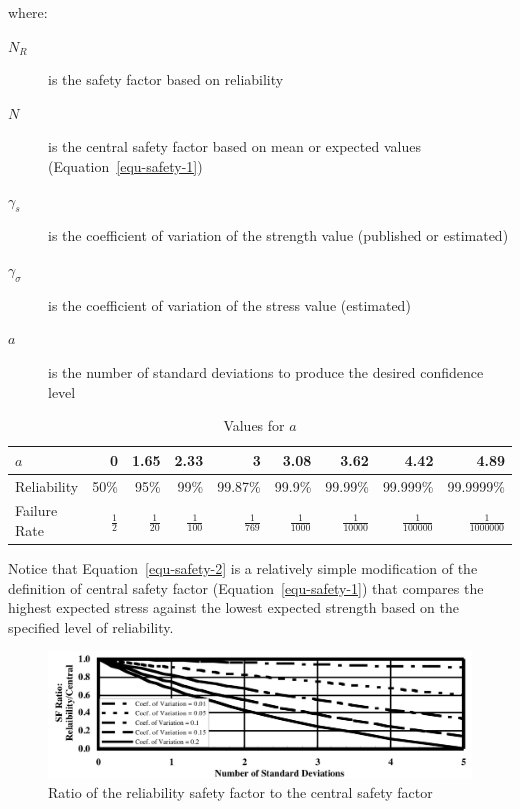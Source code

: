 \noindent where:

\begin{description}
  \item[$N_R$] is the safety factor based on reliability
  \item[$N$] is the central safety factor based on mean or expected values (Equation~\ref{equ-safety-1})
  \item[$\gamma_s$] is the coefficient of variation of the strength value (published or estimated)
  \item[$\gamma_\sigma$] is the coefficient of variation of the stress value (estimated)
  \item[$a$] is the number of standard deviations to produce the desired confidence level 
\end{description}

\begin{table}
  \center{}
  \small
  \begin{tabular}{l r r r r r r r r}
    \toprule
    $a$ & 0 & 1.65 & 2.33 & 3 & 3.08 & 3.62 & 4.42 & 4.89 \\
    \midrule
    Reliability & 50\% & 95\% & 99\% & 99.87\% & 99.9\% & 99.99\% & 99.999\% & 99.9999\% \\
    Failure Rate & $\frac{1}{2}$ & $\frac{1}{20}$ & $\frac{1}{100}$ & $\frac{1}{769}$ & $\frac{1}{1000}$ & $\frac{1}{10000}$ & $\frac{1}{100000}$ & $\frac{1}{1000000}$ \\
    \bottomrule
  \end{tabular}
  \vspace{2em}
  \caption{Values for $a$}
  \label{tbl-a}
\end{table}

Notice that Equation~\ref{equ-safety-2} is a relatively simple modification of the definition of central safety factor (Equation~\ref{equ-safety-1}) that compares the highest expected stress against the lowest expected strength based on the specified level of reliability.

\begin{figure}
  \centering
  \includegraphics[width=\textwidth]{A1_safety_factor/sf-ratio.png}
  \caption{Ratio of the reliability safety factor to the central safety factor}
\end{figure}

